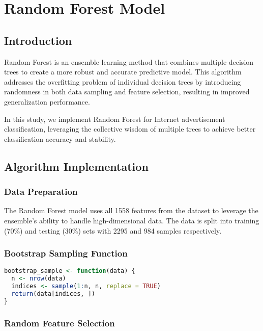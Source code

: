 \section{Random Forest Model}

\subsection{Introduction}

Random Forest is an ensemble learning method that combines multiple decision trees to create a more robust and accurate predictive model. This algorithm addresses the overfitting problem of individual decision trees by introducing randomness in both data sampling and feature selection, resulting in improved generalization performance.

In this study, we implement Random Forest for Internet advertisement classification, leveraging the collective wisdom of multiple trees to achieve better classification accuracy and stability.

\subsection{Algorithm Implementation}

\subsubsection{Data Preparation}

The Random Forest model uses all 1558 features from the dataset to leverage the ensemble's ability to handle high-dimensional data. The data is split into training (70\%) and testing (30\%) sets with 2295 and 984 samples respectively.

\subsubsection{Bootstrap Sampling Function}

\begin{lstlisting}[language=R, caption=Bootstrap Sampling Implementation]
bootstrap_sample <- function(data) {
  n <- nrow(data)
  indices <- sample(1:n, n, replace = TRUE)
  return(data[indices, ])
}
\end{lstlisting}

\subsubsection{Random Feature Selection}

